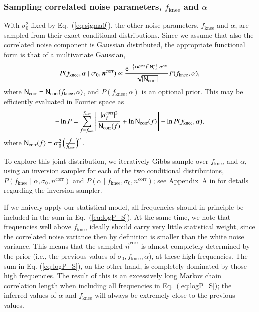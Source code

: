 \documentclass[twocolumn]{aa}
\newcommand{\n}[0]{\vec{n}}
\begin{document}
\subsubsection{Sampling correlated noise parameters, $f_\mathrm{knee}$ and $\alpha$}

With $\sigma_0^2$ fixed by Eq.~(\ref{eq:sigma0}), the other noise
parameters, $f_\mathrm{knee}$ and $\alpha$, are sampled from their
exact conditional distributions. Since we assume that also the
correlated noise component is Gaussian distributed, the appropriate
functional form is that of a multivariate Gaussian,
\begin{equation}
	P(f_\mathrm{knee},\alpha\mid\sigma_0, \boldsymbol{n}^\mathrm{corr})
        \propto \frac{\mathrm e^{-\frac{1}{2}(\boldsymbol{n}^\mathrm{corr})^T
            \mathsf{N}_\mathrm{corr}^{-1}\boldsymbol{n}^\mathrm{corr}}}{\sqrt{|\mathsf{N}_\mathrm{corr}|}}
        P(f_\mathrm{knee},\alpha),
\end{equation}
where $\mathsf{N}_{\mathrm{corr}} = \mathsf{N}_\mathrm{corr}(f_\mathrm{knee},\alpha)$, and
$P(f_\mathrm{knee},\alpha)$ is an optional prior. This may be
efficiently evaluated in Fourier space as
\begin{equation}\label{eq:logP_S}
	-\ln P = \sum_{f=f_{\mathrm{min}}}^{f_{\mathrm{max}}}
        \left[\frac{|n_f^\mathrm{corr}|^2}{\mathsf{N}_\mathrm{corr}(f)}
          + \ln{\ensuremath{\mathsf{N}}_\mathrm{corr}(f)}\right] - \ln P(f_\mathrm{knee},\alpha),
\end{equation}
where $\mathsf{N}_\mathrm{corr}(f) = \sigma_0^2 \left(\frac{f}{f_\mathrm{knee}}\right)^\alpha$.

To explore this joint distribution, we iteratively Gibbs sample over
$f_\mathrm{knee}$ and $\alpha$, using an inversion sampler for
each of the two conditional distributions, $P(f_\mathrm{knee}\mid\alpha,\sigma_0, n^\mathrm{corr})$
and $P(\alpha\mid f_\mathrm{knee}, \sigma_0, n^\mathrm{corr})$; see
Appendix~A in \citet{bp01} for details regarding the inversion
sampler.

If we naively apply our statistical model, all frequencies should in
principle be included in the sum in Eq.~(\ref{eq:logP_S}).  At the
same time, we note that frequencies well above $f_{\mathrm{knee}}$
ideally should carry very little statistical weight, since the
correlated noise variance then by definition is smaller than the white
noise variance.  This means that the sampled $\n^\mathrm{corr}$ is
almost completely determined by the prior (i.e., the previous values of
$\sigma_0, f_\mathrm{knee}, \alpha$), at these high frequencies. The
sum in Eq. (\ref{eq:logP_S}), on the other hand, is completely
dominated by those high frequencies. The result of this is an
excessively long Markov chain correlation length when including all
frequencies in Eq.~(\ref{eq:logP_S}); the inferred values of $\alpha$
and $f_\mathrm{knee}$ will always be extremely close to the previous
values.
\end{document}
